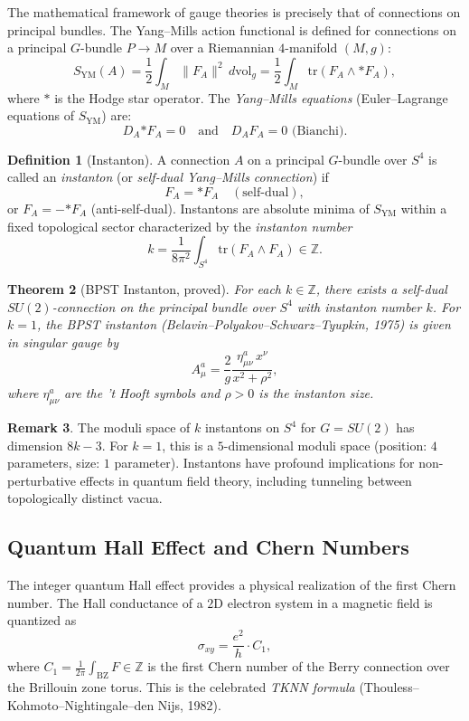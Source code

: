 \documentclass[12pt,a4paper]{amsart}
\newtheorem{theorem}{Theorem}[section]
\theoremstyle{definition}
\newtheorem{definition}[theorem]{Definition}
\newtheorem{remark}[theorem]{Remark}
\begin{document}
The mathematical framework of gauge theories is precisely that of connections
on principal bundles. The Yang--Mills action functional is defined for
connections on a principal $G$-bundle $P \to M$ over a Riemannian $4$-manifold
$(M, g)$:
\[
  S_{\mathrm{YM}}(A) = \frac{1}{2} \int_M \|F_A\|^2 \, d\mathrm{vol}_g
  = \frac{1}{2} \int_M \mathrm{tr}(F_A \wedge {*F_A}),
\]
where $*$ is the Hodge star operator. The \emph{Yang--Mills equations}
(Euler--Lagrange equations of $S_{\mathrm{YM}}$) are:
\[
  D_A {*F_A} = 0 \quad \text{and} \quad D_A F_A = 0 \text{ (Bianchi)}.
\]

\begin{definition}[Instanton]
A connection $A$ on a principal $G$-bundle over $S^4$ is called an
\emph{instanton} (or \emph{self-dual Yang--Mills connection}) if
\[
  F_A = {*F_A} \quad (\text{self-dual}),
\]
or $F_A = -{*F_A}$ (anti-self-dual). Instantons are absolute minima of
$S_{\mathrm{YM}}$ within a fixed topological sector characterized by the
\emph{instanton number}
\[
  k = \frac{1}{8\pi^2} \int_{S^4} \mathrm{tr}(F_A \wedge F_A) \in \mathbb{Z}.
\]
\end{definition}

\begin{theorem}[BPST Instanton, proved]
\label{thm:bpst}
For each $k \in \mathbb{Z}$, there exists a self-dual $SU(2)$-connection on
the principal bundle over $S^4$ with instanton number $k$. For $k=1$, the
\emph{BPST instanton} (Belavin--Polyakov--Schwarz--Tyupkin, 1975) is given in
singular gauge by
\[
  A_\mu^a = \frac{2}{g} \frac{\eta_{\mu\nu}^a \, x^\nu}{x^2 + \rho^2},
\]
where $\eta^a_{\mu\nu}$ are the 't Hooft symbols and $\rho > 0$ is the instanton
size.
\end{theorem}

\begin{remark}
The moduli space of $k$ instantons on $S^4$ for $G = SU(2)$ has dimension
$8k - 3$. For $k=1$, this is a $5$-dimensional moduli space (position: $4$
parameters, size: $1$ parameter). Instantons have profound implications for
non-perturbative effects in quantum field theory, including tunneling between
topologically distinct vacua.
\end{remark}

\subsection{Quantum Hall Effect and Chern Numbers}

The integer quantum Hall effect provides a physical realization of the first
Chern number. The Hall conductance of a $2$D electron system in a magnetic
field is quantized as
\[
  \sigma_{xy} = \frac{e^2}{h} \cdot C_1,
\]
where $C_1 = \frac{1}{2\pi} \int_{\mathrm{BZ}} F \in \mathbb{Z}$ is the first
Chern number of the Berry connection over the Brillouin zone torus. This is the
celebrated \emph{TKNN formula} (Thouless--Kohmoto--Nightingale--den Nijs, 1982).
\end{document}
